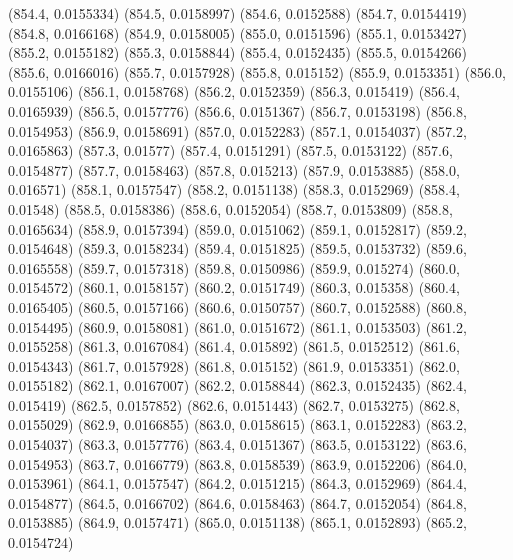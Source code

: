 {					(854.4, 0.0155334)
					(854.5, 0.0158997)
					(854.6, 0.0152588)
					(854.7, 0.0154419)
					(854.8, 0.0166168)
					(854.9, 0.0158005)
					(855.0, 0.0151596)
					(855.1, 0.0153427)
					(855.2, 0.0155182)
					(855.3, 0.0158844)
					(855.4, 0.0152435)
					(855.5, 0.0154266)
					(855.6, 0.0166016)
					(855.7, 0.0157928)
					(855.8, 0.015152)
					(855.9, 0.0153351)
					(856.0, 0.0155106)
					(856.1, 0.0158768)
					(856.2, 0.0152359)
					(856.3, 0.015419)
					(856.4, 0.0165939)
					(856.5, 0.0157776)
					(856.6, 0.0151367)
					(856.7, 0.0153198)
					(856.8, 0.0154953)
					(856.9, 0.0158691)
					(857.0, 0.0152283)
					(857.1, 0.0154037)
					(857.2, 0.0165863)
					(857.3, 0.01577)
					(857.4, 0.0151291)
					(857.5, 0.0153122)
					(857.6, 0.0154877)
					(857.7, 0.0158463)
					(857.8, 0.015213)
					(857.9, 0.0153885)
					(858.0, 0.016571)
					(858.1, 0.0157547)
					(858.2, 0.0151138)
					(858.3, 0.0152969)
					(858.4, 0.01548)
					(858.5, 0.0158386)
					(858.6, 0.0152054)
					(858.7, 0.0153809)
					(858.8, 0.0165634)
					(858.9, 0.0157394)
					(859.0, 0.0151062)
					(859.1, 0.0152817)
					(859.2, 0.0154648)
					(859.3, 0.0158234)
					(859.4, 0.0151825)
					(859.5, 0.0153732)
					(859.6, 0.0165558)
					(859.7, 0.0157318)
					(859.8, 0.0150986)
					(859.9, 0.015274)
					(860.0, 0.0154572)
					(860.1, 0.0158157)
					(860.2, 0.0151749)
					(860.3, 0.015358)
					(860.4, 0.0165405)
					(860.5, 0.0157166)
					(860.6, 0.0150757)
					(860.7, 0.0152588)
					(860.8, 0.0154495)
					(860.9, 0.0158081)
					(861.0, 0.0151672)
					(861.1, 0.0153503)
					(861.2, 0.0155258)
					(861.3, 0.0167084)
					(861.4, 0.015892)
					(861.5, 0.0152512)
					(861.6, 0.0154343)
					(861.7, 0.0157928)
					(861.8, 0.015152)
					(861.9, 0.0153351)
					(862.0, 0.0155182)
					(862.1, 0.0167007)
					(862.2, 0.0158844)
					(862.3, 0.0152435)
					(862.4, 0.015419)
					(862.5, 0.0157852)
					(862.6, 0.0151443)
					(862.7, 0.0153275)
					(862.8, 0.0155029)
					(862.9, 0.0166855)
					(863.0, 0.0158615)
					(863.1, 0.0152283)
					(863.2, 0.0154037)
					(863.3, 0.0157776)
					(863.4, 0.0151367)
					(863.5, 0.0153122)
					(863.6, 0.0154953)
					(863.7, 0.0166779)
					(863.8, 0.0158539)
					(863.9, 0.0152206)
					(864.0, 0.0153961)
					(864.1, 0.0157547)
					(864.2, 0.0151215)
					(864.3, 0.0152969)
					(864.4, 0.0154877)
					(864.5, 0.0166702)
					(864.6, 0.0158463)
					(864.7, 0.0152054)
					(864.8, 0.0153885)
					(864.9, 0.0157471)
					(865.0, 0.0151138)
					(865.1, 0.0152893)
					(865.2, 0.0154724)
}
